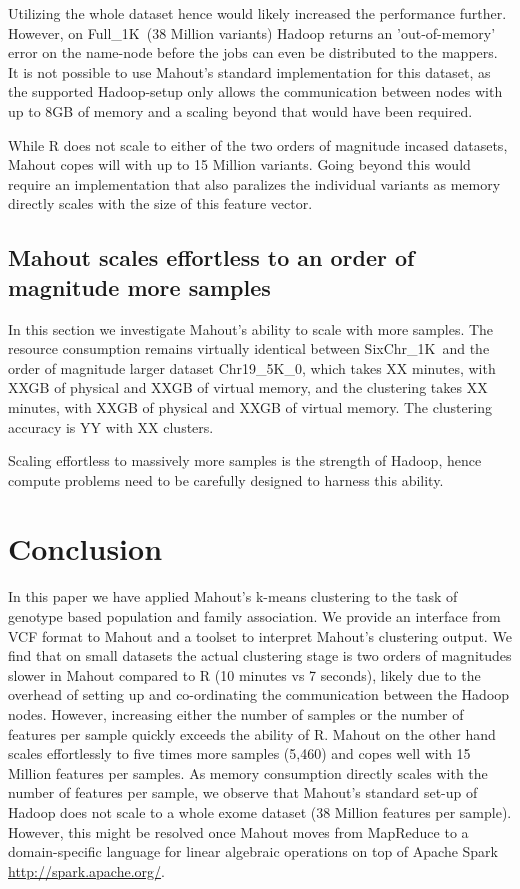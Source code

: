 \documentclass[twocolumn]{bmcart}%
\newcommand{\SixReal}{SixChr\_1K}
\newcommand{\FullReal}{Full\_1K}
\newcommand{\SixArtiExact}{Chr19\_5K\_0}
\begin{document}
Utilizing the whole dataset hence would likely increased the performance further. However, on \FullReal\ (38 Million variants) Hadoop returns an 'out-of-memory' error on the name-node before the jobs can even be distributed to the mappers. 
It is not possible to use Mahout's standard implementation for this dataset, as the supported Hadoop-setup only allows the communication between nodes with up to 8GB of memory and a scaling beyond that would have been required.

While R does not scale to either of the two orders of magnitude incased datasets, Mahout copes will with up to 15 Million variants. Going beyond this would require an implementation that also paralizes the individual variants as memory directly scales with the size of this feature vector.  


\subsection*{Mahout scales effortless to an order of magnitude more samples}
In this section we investigate Mahout's ability to scale with more samples.
The resource consumption remains virtually identical between \SixReal\ and the order of magnitude larger dataset \SixArtiExact, which takes XX minutes, with XXGB of physical and XXGB of virtual memory, and the clustering takes XX minutes, with XXGB of physical and XXGB of virtual memory. 
The clustering accuracy is YY with XX clusters.

Scaling effortless to massively more samples is the strength of Hadoop, hence compute problems need to be carefully designed to harness this ability.  



\section*{Conclusion}
In this paper we have applied Mahout's k-means clustering to the task of genotype based population and family association. 
We provide an interface from VCF format to Mahout and a toolset to interpret Mahout's clustering output. 
We find that on small datasets the actual clustering stage is two orders of magnitudes slower in Mahout compared to R (10 minutes vs 7 seconds), likely due to the overhead of setting up and co-ordinating the communication between the Hadoop nodes. 
However, increasing either the number of samples or the number of features per sample quickly exceeds the ability of R.
Mahout on the other hand scales effortlessly to five times more samples (5,460) and copes well with 15 Million features per samples.
As memory consumption directly scales with the number of features per sample, we observe that Mahout's standard set-up of Hadoop does not scale to a whole exome dataset (38 Million features per sample).
However, this might be resolved once Mahout moves from MapReduce to a domain-specific language for linear algebraic operations on top of Apache Spark \url{http://spark.apache.org/}.
\end{document}
